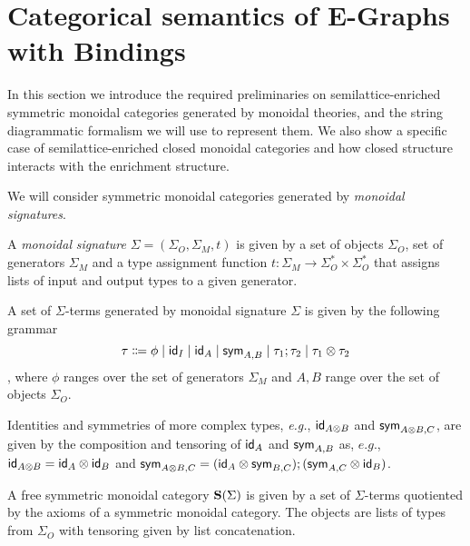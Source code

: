 \section{Categorical semantics of E-Graphs with Bindings}

In this section we introduce the required preliminaries on semilattice-enriched symmetric monoidal categories generated by monoidal theories, and the string diagrammatic formalism we will use to represent them.
We also show a specific case of semilattice-enriched closed monoidal categories and how closed structure interacts with the enrichment structure.

We will consider symmetric monoidal categories generated by \textit{monoidal signatures}.

\begin{definition}

A \textit{monoidal} \textit{signature} $\Sigma = (\Sigma_{O}, \Sigma_{M}, t)$ is given by a set of objects $\Sigma_{O}$, set of generators $\Sigma_{M}$ and a type assignment function $t : \Sigma_{M} \to \Sigma_{O}^{*} \times \Sigma_{O}^{*}$ that assigns lists of input and output types to a given generator.
\end{definition}

\begin{definition}

A set of $\Sigma$-terms generated by monoidal signature $\Sigma$ is given by the following grammar
\[
\tau \Coloneq \phi \;|\; \id_{I} \;|\; \id_{A} \;|\; \sym_{A,B} \;|\; \tau_{1};\tau_{2} \;|\; \tau_{1} \otimes \tau_{2}
\],
where $\phi$ ranges over the set of generators $\Sigma_{M}$ and $A,B$ range over the set of objects $\Sigma_{O}$.
\end{definition}

Identities and symmetries of more complex types, \textit{e.g.}, $\textsf{id}_{A \otimes B}$ and $\textsf{sym}_{A \otimes B, C}$, are given by the composition and tensoring of $\textsf{id}_{A}$ and $\textsf{sym}_{A,B}$ as, $\textit{e.g.}$, $\textsf{id}_{A \otimes B} = \textsf{id}_{A} \otimes \textsf{id}_{B}$ and $\textsf{sym}_{A \otimes B, C} = (\textsf{id}_{A} \otimes \textsf{sym}_{B,C});(\textsf{sym}_{A,C} \otimes \textsf{id}_{B})$.

\begin{definition}
A free symmetric monoidal category $\mathbf{S}(\Sigma)$ is given by a set of $\Sigma$-terms quotiented by the axioms of a symmetric monoidal category.
The objects are lists of types from $\Sigma_{O}$ with tensoring given by list concatenation.
\end{definition}

